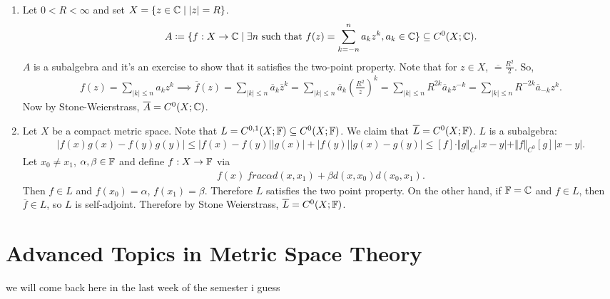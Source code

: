 \documentclass{report}
\begin{document}
{\begin{enumerate}
        If $\FF = \RR$, then Stone Weierstrass says that $\mathcal P_{\FF}(K)$ is dense in $C^0(K; \RR)$. On the other hand, $f \in \mathcal P_{\CC}(K)$ if and only if $f(x) = \sum_{|\alpha| \leq d} a_\alpha x^{\alpha}$ for $a_\alpha \in \CC$. This means that $\overline f(x) = \sum_{|\alpha| \leq d} \overline{a_\alpha}x^\alpha \implies \overline f \in \mathcal P_{\CC}(K)$, so the algebra is self-adjoint and therefore dense in $C^0(K; \CC)$.
        \item Let $0 < R < \infty$ and set $X = \{z \in \CC \mid |z| = R\}$. 
        \begin{align*}
            A \coloneq \{f : X \to \CC \mid \exists n \text{ such that }f(z) = \sum_{k = -n}^n a_k z^k , a_k \in \CC\} \subseteq C^0(X; \CC).
        \end{align*}
        $A$ is a subalgebra and it's an exercise to show that it satisfies the two-point property. Note that for $z \in X$, $\overline   = \frac{R^2}{2}$. So, 
        \begin{align*}
            f(z) = \sum_{|k| \leq n} a_k z^k \implies \overline f(z) = \sum_{|k|\leq n} \overline a_k \overline z^k = \sum_{|k| \leq n} \overline a_k \left(\frac{R^2}{z}\right)^k = \sum_{|k| \leq n}R^{2k} \overline a_k z^{-k} = \sum_{|k| \leq n} R^{-2k} \overline a_{-k} z^k.
        \end{align*}
        Now by Stone-Weierstrass, $\overline A = C^0(X; \CC)$. 
        \item Let $X$ be a compact metric space. Note that $L = C^{0,1}(X; \FF) \subseteq C^0(X; \FF)$. We claim that $\overline L = C^0(X; \FF)$. $L$ is a subalgebra:
        \begin{align*}
            |f(x)g(x) - f(y)g(y)| \leq |f(x) - f(y)||g(x)| + |f(y)||g(x) - g(y)| \leq [f]\cdot \Vert g\Vert_{C^0}|x-y| + \Vert f\Vert_{C^0} [g]|x-y|.
        \end{align*}
        Let $x_0 \neq x_1$, $\alpha, \beta \in \FF$ and define $f: X \to \FF$ via 
        \begin{align*}
            f(x) \ frac{\alpha d(x, x_1) + \beta d(x, x_0)}{d(x_0, x_1)}.
        \end{align*}
        Then $f \in L$ and $f(x_0) = \alpha$, $f(x_1) = \beta$. Therefore $L$ satisfies the two point property. On the other hand, if $\FF = \CC$ and $f \in L$, then $\overline f \in L$, so $L$ is self-adjoint. Therefore by Stone Weierstrass, $\overline L = C^0(X; \FF)$.
    \end{enumerate}
}
\chapter{Advanced Topics in Metric Space Theory}
we will come back here in the last week of the semester i guess
\end{document}
